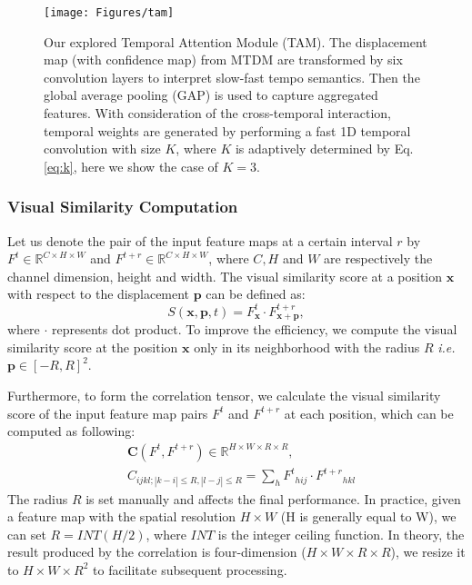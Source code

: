 \documentclass[journal]{IEEEtran}
\begin{document}
\begin{figure*}[tbp]
  \texttt{[image: Figures/tam]}
  \caption{Our explored Temporal Attention Module (TAM). The displacement map (with confidence map) from MTDM are transformed by six convolution layers to interpret slow-fast tempo semantics. Then the global average pooling (GAP) is used to capture aggregated features. With consideration of the cross-temporal interaction, temporal weights are generated by performing a fast 1D temporal convolution with size $K$, where $K$ is adaptively determined by Eq. \ref{eq:k}, here we show the case of $K=3$.}
  \label{fig:tam}
\end{figure*}


\subsubsection{Visual Similarity Computation}
Let us denote the pair of the input feature maps at a certain interval $r$ by $F^{t}\in \mathbb{R}^{C \times H \times W}$ and $F^{t+r}\in \mathbb{R}^{C \times H \times W}$, where $C,H$ and $W$ are respectively the channel dimension, height and width. The visual similarity score at a position $\mathbf{x}$ with respect to the displacement $\mathbf{p}$ can be defined as:
\begin{equation}
    \label{eq:s}
  S(\mathbf{x},\mathbf{p},t) = F^{t}_{\mathbf{x}} \cdot F^{t+r}_{\mathbf{x}+\mathbf{p}},
\end{equation}
where $ \cdot $ represents dot product. To improve the efficiency, we compute the visual similarity score at the position $\mathbf{x}$ only in its neighborhood with the radius $R$ \textit{i.e.} $\mathbf{p} \in [-R, R]^2$.

Furthermore, to form the correlation tensor, we calculate the visual similarity score of the input feature map pairs $F^t$ and $F^{t+r}$ at each position, which can be computed as following:
\begin{equation}\label{c2}
\begin{aligned}
  & \mathbf{C}(F^{t}, F^{t+r}) \in \mathbb{R}^{H \times W \times R \times R}, \\
  & C_{i j k l;|k-i| \le R,|l-j| \le R }=\sum_{h} { {F^{t}}_{h i j } \cdot {F^{t+r}}_{h k l} }
\end{aligned}
\end{equation}
The radius $R$ is set manually and affects the final performance. In practice, given a feature map with the spatial resolution $H \times W$ (H is generally equal to W), we can set $R=INT(H/2)$, where $INT$ is the integer ceiling function. In theory, the result produced by the correlation is four-dimension ($H \times W \times R \times R$), we resize it to $H \times W \times R^2$ to facilitate subsequent processing.
\end{document}
